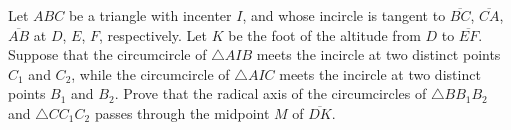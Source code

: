 Let $ABC$ be a triangle with incenter $I$, and whose incircle is tangent to $\overline{BC}$, $\overline{CA}$, $\overline{AB}$ at $D$, $E$, $F$, respectively.  Let $K$ be the foot of the altitude from $D$ to $\overline{EF}$.  Suppose that the circumcircle of $\triangle AIB$ meets the incircle at two distinct points $C_1$ and $C_2$, while the circumcircle of $\triangle AIC$ meets the incircle at two distinct points $B_1$ and $B_2$.  Prove that the radical axis of the circumcircles of $\triangle BB_1B_2$ and $\triangle CC_1C_2$ passes through the midpoint $M$ of $\overline{DK}$.